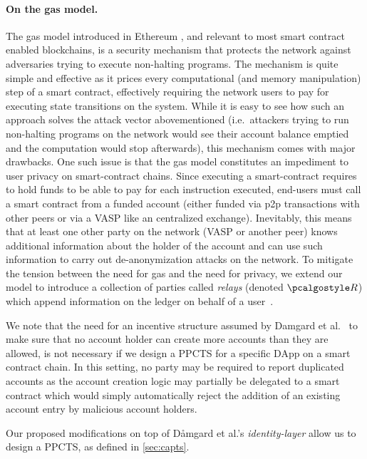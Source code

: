 \documentclass[runningheads,10pt]{llncs}
\numberwithin{equation}{section}
\begin{document}
\paragraph{On the gas model.}
The gas model introduced in Ethereum \cite{ethyellowpaper}, and relevant to
most smart contract enabled blockchains, is a security
mechanism that protects the network against adversaries trying to execute
non-halting programs. The mechanism is quite simple and effective as it prices
every computational (and memory manipulation) step of a smart contract,
effectively requiring the network users to pay for executing state transitions
on the system. While it is easy to see how such an approach solves the attack
vector abovementioned (i.e.~attackers trying to run non-halting
programs on the network would see their account balance emptied and the
computation would stop afterwards), this mechanism comes with major
drawbacks. One such issue is that the gas model constitutes an impediment to
user privacy on smart-contract chains. Since executing a smart-contract
requires to hold funds to be able to pay for each instruction executed,
end-users must call a smart contract from a funded account
(either funded via p2p transactions with other peers or via a VASP like an
centralized exchange). Inevitably, this means that at least one other party on
the network (VASP or another peer) knows additional information about the
holder of the account and can use such information to carry out de-anonymization
attacks on the network. To mitigate the tension between the need for gas and
the need for privacy, we extend our model to introduce
a collection of parties called \emph{relays} (denoted $\relay$) which append
information on the ledger on behalf of a user~\cite{zeth-relay}.

\begin{remark}
  We note that the need for an incentive structure assumed by Damgard et
  al.~\cite[Section 3.4]{EPRINT:DGKOS20} to make sure that no account
  holder can create more accounts than they are allowed, is not necessary if we
  design a PPCTS for a specific DApp on a smart contract chain. In this
  setting, no party may be required to report duplicated accounts as the
  account creation logic may partially be delegated to a smart contract which 
  would simply automatically reject the addition of an existing account entry
  by malicious account holders.
\end{remark}

Our proposed modifications on top of Dåmgard et al.'s \emph{identity-layer}
allow us to design a PPCTS, as defined in \cref{sec:capts}.
\end{document}
